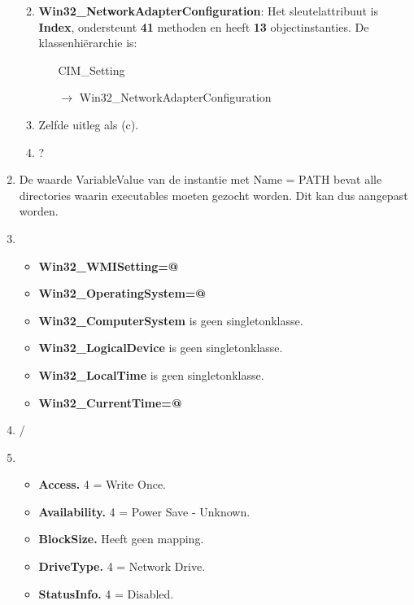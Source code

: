 \documentclass{report}
\begin{document}
\begin{enumerate}
\begin{enumerate}
\begin{itemize}
					\end{itemize} 
					
					\item \textbf{Win32\_NetworkAdapterConfiguration}: Het sleutelattribuut is \textbf{Index}, ondersteunt \textbf{41} methoden en heeft \textbf{13} objectinstanties. De klassenhiërarchie is:
					\begin{itemize}
						\item[] CIM\_Setting
						\item[$\rightarrow$] Win32\_NetworkAdapterConfiguration
					\end{itemize} 
				
					\item Zelfde uitleg als (c).
					
					\item ?
				\end{enumerate}
		\item De waarde VariableValue van de instantie met Name = PATH bevat alle directories waarin executables moeten gezocht worden. Dit kan dus aangepast worden.
		
		\item 
		\begin{itemize}
			\item \textbf{Win32\_WMISetting=@}
			\item \textbf{Win32\_OperatingSystem=@}
			\item \textbf{Win32\_ComputerSystem} is geen singletonklasse.
			\item \textbf{Win32\_LogicalDevice} is geen singletonklasse.
			\item \textbf{Win32\_LocalTime} is geen singletonklasse.
			\item \textbf{Win32\_CurrentTime=@}
		\end{itemize}
	
		\item /
		
		\item 
			\begin{itemize}
				\item \textbf{Access.} 4 = Write Once.
				\item \textbf{Availability.} 4 = Power Save - Unknown.
				\item \textbf{BlockSize.} Heeft geen mapping.
				\item \textbf{DriveType.} 4 = Network Drive.
				\item \textbf{StatusInfo.} 4 = Disabled.
			\end{itemize}
		

\end{enumerate}
\end{document}
